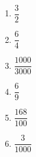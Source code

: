 %
%
  \begin{enumerate}
    \item $\dfrac{3}{2}$
    \item $\dfrac{6}{4}$
    \item $\dfrac{1000}{3000}$
    \item $\dfrac{6}{9}$
    \item $\dfrac{168}{100}$
    \item $\dfrac{3}{1000}$
  \end{enumerate}
